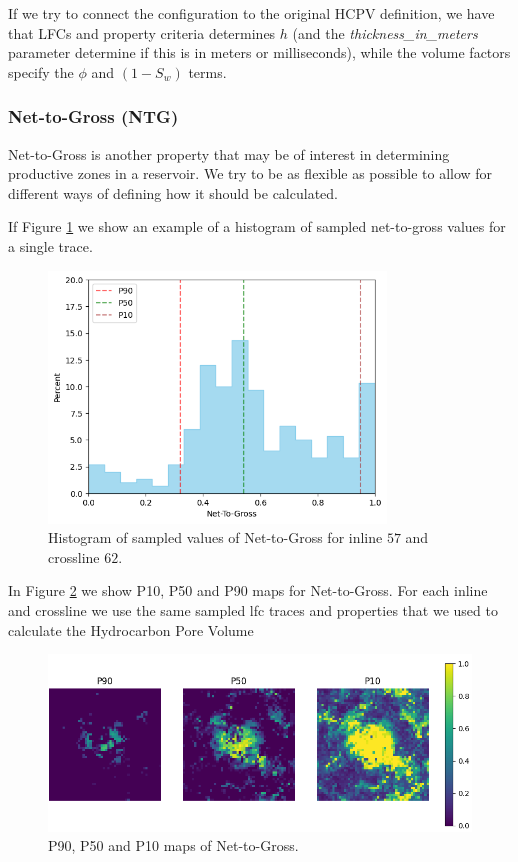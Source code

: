 \documentclass[note,screen,english,12pt,utf8]{nrdoc}
\begin{document}
If we try to connect the configuration to the original HCPV definition, we
have that LFCs and property criteria determines $h$ (and the \emph{thickness\_in\_meters}
parameter determine if this is in meters or milliseconds), while
the volume factors specify the $\phi$ and $(1 - S_w)$ terms.

\subsubsection{Net-to-Gross (NTG)}

Net-to-Gross is another property that may be of interest in determining
productive zones in a reservoir.
We try to be as flexible as possible to allow for different ways of
defining how it should be calculated.

If Figure \ref{fig:net_to_gross_histogram} we show an example of a histogram
of sampled net-to-gross values for a single trace.
\begin{figure}[h]
    \centering
    \includegraphics[width=0.8\textwidth]{figures/net_to_gross_il57_xl62.png}
    \caption{Histogram of sampled values of Net-to-Gross for inline $57$ and crossline $62$.}
    \label{fig:net_to_gross_histogram}
\end{figure}


In Figure \ref{fig:net_to_gross_maps} we show P10, P50 and P90 maps for
Net-to-Gross. For each inline and crossline we use the same sampled lfc
traces and properties that we used to calculate the Hydrocarbon Pore Volume

\begin{figure}[h]
    \centering
    \includegraphics[width=\textwidth]{figures/net_to_gross_p90_p50_p10.png}
    \caption{P90, P50 and P10 maps of Net-to-Gross.}
    \label{fig:net_to_gross_maps}
\end{figure}
\end{document}
